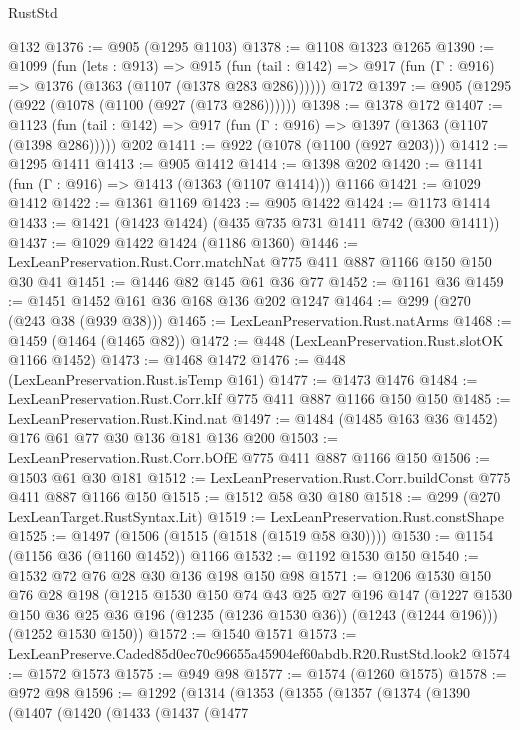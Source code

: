 \begin{lexlean}{RustStd}
\begin{coremodule}
    @132
@1376 := @905 (@1295 @1103)
@1378 := @1108 @1323 @1265
@1390 := @1099
    (fun (lets : @913) =>
    @915 (fun (tail : @142) => @917 (fun (Γ : @916) => @1376 (@1363 (@1107 (@1378 @283 @286))))))
    @172
@1397 := @905 (@1295 (@922 (@1078 (@1100 (@927 (@173 @286))))))
@1398 := @1378 @172
@1407 := @1123
    (fun (tail : @142) => @917 (fun (Γ : @916) => @1397 (@1363 (@1107 (@1398 @286)))))
    @202
@1411 := @922 (@1078 (@1100 (@927 @203)))
@1412 := @1295 @1411
@1413 := @905 @1412
@1414 := @1398 @202
@1420 := @1141 (fun (Γ : @916) => @1413 (@1363 (@1107 @1414))) @1166
@1421 := @1029 @1412
@1422 := @1361 @1169
@1423 := @905 @1422
@1424 := @1173 @1414
@1433 := @1421 (@1423 @1424) (@435 @735 @731 @1411 @742 (@300 @1411))
@1437 := @1029 @1422 @1424 (@1186 @1360)
@1446 := LexLeanPreservation.Rust.Corr.matchNat @775 @411 @887 @1166 @150 @150 @30 @41
@1451 := @1446 @82 @145 @61 @36 @77
@1452 := @1161 @36
@1459 := @1451 @1452 @161 @36 @168 @136 @202 @1247
@1464 := @299 (@270 (@243 @38 (@939 @38)))
@1465 := LexLeanPreservation.Rust.natArms
@1468 := @1459 (@1464 (@1465 @82))
@1472 := @448 (LexLeanPreservation.Rust.slotOK @1166 @1452)
@1473 := @1468 @1472
@1476 := @448 (LexLeanPreservation.Rust.isTemp @161)
@1477 := @1473 @1476
@1484 := LexLeanPreservation.Rust.Corr.kIf @775 @411 @887 @1166 @150 @150
@1485 := LexLeanPreservation.Rust.Kind.nat
@1497 := @1484 (@1485 @163 @36 @1452) @176 @61 @77 @30 @136 @181 @136 @200
@1503 := LexLeanPreservation.Rust.Corr.bOfE @775 @411 @887 @1166 @150
@1506 := @1503 @61 @30 @181
@1512 := LexLeanPreservation.Rust.Corr.buildConst @775 @411 @887 @1166 @150
@1515 := @1512 @58 @30 @180
@1518 := @299 (@270 LexLeanTarget.RustSyntax.Lit)
@1519 := LexLeanPreservation.Rust.constShape
@1525 := @1497 (@1506 (@1515 (@1518 (@1519 @58 @30))))
@1530 := @1154 (@1156 @36 (@1160 @1452)) @1166
@1532 := @1192 @1530 @150
@1540 := @1532 @72 @76 @28 @30 @136 @198 @150 @98
@1571 := @1206
    @1530
    @150
    @76
    @28
    @198
    (@1215
      @1530
      @150
      @74
      @43
      @25
      @27
      @196
      @147
      (@1227 @1530 @150 @36 @25 @36 @196 (@1235 (@1236 @1530 @36)) (@1243 (@1244 @196)))
      (@1252 @1530 @150))
@1572 := @1540 @1571
@1573 := LexLeanPreserve.Caded85d0ec70c96655a45904ef60abdb.R20.RustStd.look2
@1574 := @1572 @1573
@1575 := @949 @98
@1577 := @1574 (@1260 @1575)
@1578 := @972 @98
@1596 := @1292
    (@1314
      (@1353
        (@1355
          (@1357
            (@1374
              (@1390
                (@1407
                  (@1420
                    (@1433
                      (@1437
                        (@1477

\end{coremodule}
\end{lexlean}
